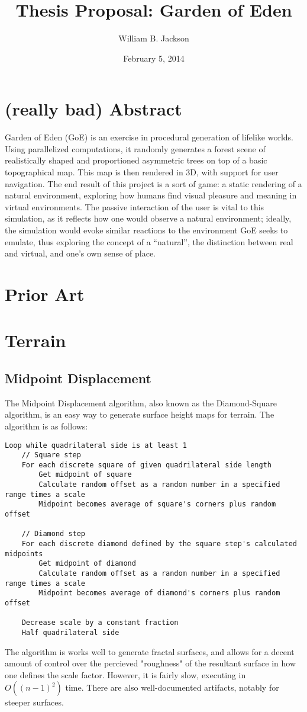 \documentclass{article}
\title{Thesis Proposal: Garden of Eden}
\author{William B. Jackson}
\date{February 5, 2014}
\newcommand{\tab}{\hspace*{2em}}
\begin{document}
    \maketitle
    \section{(really bad) Abstract} %
    \tab Garden of Eden (GoE) is an exercise in procedural generation of lifelike worlds. Using
parallelized computations, it randomly generates a forest scene of realistically shaped and
proportioned asymmetric trees on top of a basic topographical map. This map is then rendered in 3D,
with support for user navigation. The end result of this project is a sort of game: a static
rendering of a natural environment, exploring how humans find visual pleasure and meaning in virtual
environments. The passive interaction of the user is vital to this simulation, as it reflects how
one would observe a natural environment; ideally, the simulation would evoke similar reactions to
the environment GoE seeks to emulate, thus exploring the concept of a “natural”, the distinction
between real and virtual, and one's own sense of place.

    \section{Prior Art}

    \section{Terrain}
        \subsection{Midpoint Displacement}
\tab The Midpoint Displacement algorithm, also known as the Diamond-Square algorithm, is an easy
way to generate surface height maps for terrain. The algorithm is as follows:
    \begin{verbatim}
Loop while quadrilateral side is at least 1
    // Square step
    For each discrete square of given quadrilateral side length
        Get midpoint of square
        Calculate random offset as a random number in a specified range times a scale
        Midpoint becomes average of square's corners plus random offset

    // Diamond step
    For each discrete diamond defined by the square step's calculated midpoints
        Get midpoint of diamond
        Calculate random offset as a random number in a specified range times a scale
        Midpoint becomes average of diamond's corners plus random offset

    Decrease scale by a constant fraction
    Half quadrilateral side

    \end{verbatim}
    \tab The algorithm is works well to generate fractal surfaces, and allows for a decent amount
of control over the percieved "roughness" of the resultant surface in how one defines the scale
factor. However, it is fairly slow, executing in $O((n-1)^2)$ time. There are also well-documented
artifacts, notably for steeper surfaces.
\end{document}
